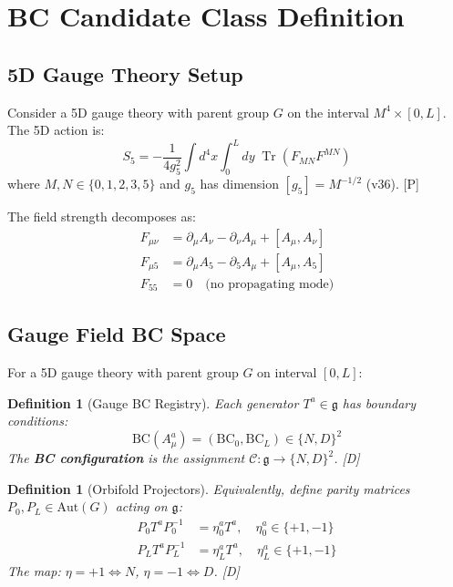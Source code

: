 \documentclass[11pt,a4paper]{article}
\newtheorem{definition}[theorem]{Definition}
\newcommand{\tagD}{\textcolor{blue!70!black}{[D]}}
\newcommand{\tagP}{\textcolor{green!50!black}{[P]}}
\DeclareMathOperator{\Tr}{Tr}
\begin{document}
\section{BC Candidate Class Definition}

\subsection{5D Gauge Theory Setup}

Consider a 5D gauge theory with parent group $G$ on the interval $M^4 \times [0, L]$.
The 5D action is:
\begin{equation}
\label{eq:5d-action}
S_5 = -\frac{1}{4g_5^2} \int d^4x \int_0^L dy\; \Tr(F_{MN} F^{MN})
\end{equation}
where $M, N \in \{0,1,2,3,5\}$ and $g_5$ has dimension $[g_5] = M^{-1/2}$ (v36). \tagP

The field strength decomposes as:
\begin{align}
\label{eq:Fmunu}
F_{\mu\nu} &= \partial_\mu A_\nu - \partial_\nu A_\mu + [A_\mu, A_\nu] \\
\label{eq:Fmu5}
F_{\mu 5} &= \partial_\mu A_5 - \partial_5 A_\mu + [A_\mu, A_5] \\
\label{eq:F55}
F_{55} &= 0 \quad \text{(no propagating mode)}
\end{align}

\subsection{Gauge Field BC Space}

For a 5D gauge theory with parent group $G$ on interval $[0, L]$:

\begin{definition}[Gauge BC Registry]
\label{def:gauge-bc}
Each generator $T^a \in \mathfrak{g}$ has boundary conditions:
\begin{equation}
\label{eq:bc-pair}
\text{BC}(A_\mu^a) = (\text{BC}_0, \text{BC}_L) \in \{N, D\}^2
\end{equation}
The \textbf{BC configuration} is the assignment $\mathcal{C}: \mathfrak{g} \to \{N,D\}^2$. \tagD
\end{definition}

\begin{definition}[Orbifold Projectors]
\label{def:projectors}
Equivalently, define parity matrices $P_0, P_L \in \text{Aut}(G)$ acting on $\mathfrak{g}$:
\begin{align}
\label{eq:P0-action}
P_0 T^a P_0^{-1} &= \eta_0^a T^a, \quad \eta_0^a \in \{+1, -1\} \\
\label{eq:PL-action}
P_L T^a P_L^{-1} &= \eta_L^a T^a, \quad \eta_L^a \in \{+1, -1\}
\end{align}
The map: $\eta = +1 \Leftrightarrow N$, $\eta = -1 \Leftrightarrow D$. \tagD
\end{definition}
\end{document}
